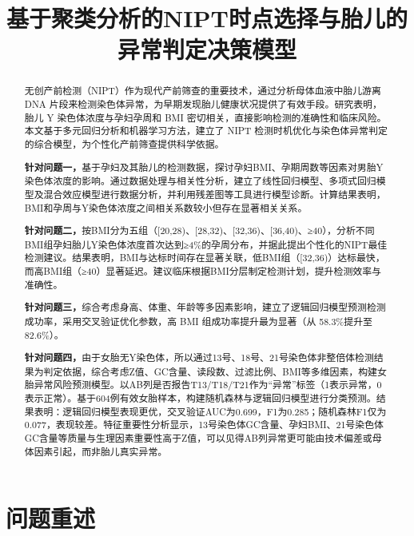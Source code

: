 \documentclass[withoutpreface,bwprint]{cumcmthesis} %
\title{基于聚类分析的NIPT时点选择与胎儿的异常判定决策模型}
\begin{document}
\maketitle
\nocite{*}


\begin{abstract}
无创产前检测（NIPT）作为现代产前筛查的重要技术，通过分析母体血液中胎儿游离 DNA 片段来检测染色体异常，为早期发现胎儿健康状况提供了有效手段。研究表明，胎儿 Y 染色体浓度与孕妇孕周和 BMI 密切相关，直接影响检测的准确性和临床风险。本文基于多元回归分析和机器学习方法，建立了 NIPT 检测时机优化与染色体异常判定的综合模型，为个性化产前筛查提供科学依据。

    \textbf{针对问题一，}基于孕妇及其胎儿的检测数据，探讨孕妇BMI、孕期周数等因素对男胎Y染色体浓度的影响。通过数据处理与相关性分析，建立了线性回归模型、多项式回归模型及混合效应模型进行数据分析，并利用残差图等工具进行模型诊断。计算结果表明，BMI和孕周与Y染色体浓度之间相关系数较小但存在显著相关关系。

    \textbf{针对问题二，}按BMI分为五组（[20,28)、[28,32)、[32,36)、[36,40)、≥40），分析不同BMI组孕妇胎儿Y染色体浓度首次达到≥4\%的孕周分布，并据此提出个性化的NIPT最佳检测建议。结果表明，BMI与达标时间存在显著关联，低BMI组（[32,36)）达标最快，而高BMI组（≥40）显著延迟。建议临床根据BMI分层制定检测计划，提升检测效率与准确性。

    \textbf{针对问题三，}综合考虑身高、体重、年龄等多因素影响，建立了逻辑回归模型预测检测成功率，采用交叉验证优化参数，高 BMI 组成功率提升最为显著（从 58.3\%提升至 82.6\%）。

    \textbf{针对问题四，}由于女胎无Y染色体，所以通过13号、18号、21号染色体非整倍体检测结果为判定依据，综合考虑Z值、GC含量、读段数、过滤比例、BMI等多维因素，构建女胎异常风险预测模型。以AB列是否报告T13/T18/T21作为“异常”标签（1表示异常，0表示正常）。基于604例有效女胎样本，构建随机森林与逻辑回归模型进行分类预测。结果表明：逻辑回归模型表现更优，交叉验证AUC为0.699，F1为0.285；随机森林F1仅为0.077，表现较差。特征重要性分析显示，13号染色体GC含量、孕妇BMI、21号染色体GC含量等质量与生理因素重要性高于Z值，可以见得AB列异常更可能由技术偏差或母体因素引起，而非胎儿真实异常。

\end{abstract}

\section{问题重述}
\end{document}
